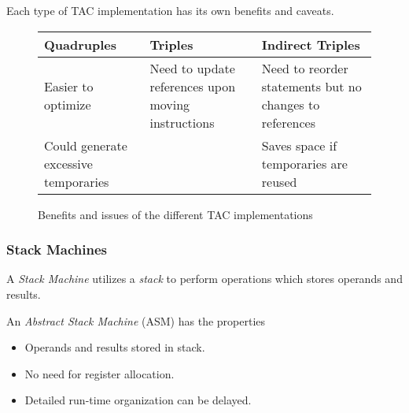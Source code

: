 \begin{remark}
    Each type of TAC implementation has its own benefits and caveats.
    \begin{figure}[H]
        \centering
        \begin{tabularx}{\textwidth}{@{} X X X @{}}
            \toprule
            Quadruples & Triples & Indirect Triples \\
            \midrule
            Easier to optimize
            & Need to update references upon moving instructions
            & Need to reorder statements but no changes to references \\
            Could generate excessive temporaries 
            &
            & Saves space if temporaries are reused \\
            \bottomrule
        \end{tabularx}
        \caption{Benefits and issues of the different TAC implementations}
        \label{fig:tac-implemenations-evaluation}
    \end{figure}
\end{remark}

\subsubsection{Stack Machines}

\begin{definition}
    A \textit{Stack Machine} utilizes a \textit{stack} to perform operations which stores operands and results.
\end{definition}

\begin{definition}
    An \textit{Abstract Stack Machine} (ASM) has the properties
    \begin{itemize}
        \item Operands and results stored in stack.
        \item No need for register allocation.
        \item Detailed run-time organization can be delayed.
    \end{itemize}
\end{definition}

